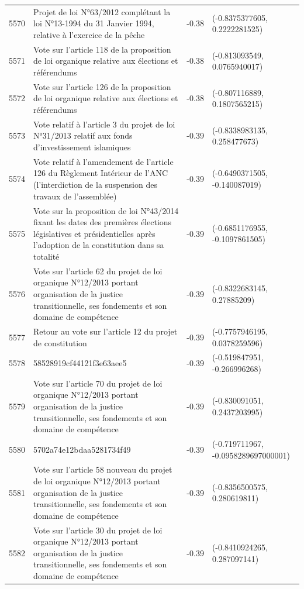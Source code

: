 \begin{table}[ht]
\begin{tabular}{rlrl}
  5570 & Projet de loi N°63/2012 complétant la loi N°13-1994 du 31 Janvier 1994, relative à l'exercice de la pêche & -0.38 & (-0.8375377605, 0.2222281525) \\ 
  5571 & Vote sur l'article 118 de la proposition de loi organique relative aux élections et référendums & -0.38 & (-0.813093549, 0.0765940017) \\ 
  5572 & Vote sur l'article 126 de la proposition de loi organique relative aux élections et référendums & -0.38 & (-0.807116889, 0.1807565215) \\ 
  5573 & Vote relatif à l'article 3 du projet de loi N°31/2013 relatif aux fonds d'investissement islamiques & -0.39 & (-0.8338983135, 0.258477673) \\ 
  5574 & Vote relatif à l'amendement de l'article 126 du Règlement Intérieur de l'ANC (l'interdiction de la suspension des travaux de l'assemblée) & -0.39 & (-0.6490371505, -0.140087019) \\ 
  5575 & Vote sur la proposition de loi N°43/2014 fixant les dates des premières élections législatives et présidentielles après l'adoption de la constitution dans sa totalité & -0.39 & (-0.6851176955, -0.1097861505) \\ 
  5576 & Vote sur l'article 62 du projet de loi organique N°12/2013 portant organisation de la justice transitionnelle, ses fondements et son domaine de compétence & -0.39 & (-0.8322683145, 0.27885209) \\ 
  5577 & Retour au vote sur l'article 12 du projet de constitution & -0.39 & (-0.7757946195, 0.0378259596) \\ 
  5578 & 58528919cf44121f3e63aee5 & -0.39 & (-0.519847951, -0.266996268) \\ 
  5579 & Vote sur l'article 70 du projet de loi organique N°12/2013 portant organisation de la justice transitionnelle, ses fondements et son domaine de compétence & -0.39 & (-0.830091051, 0.2437203995) \\ 
  5580 & 5702a74e12bdaa5281734f49 & -0.39 & (-0.719711967, -0.0958289697000001) \\ 
  5581 & Vote sur l'article 58 nouveau du projet de loi organique N°12/2013 portant organisation de la justice transitionnelle, ses fondements et son domaine de compétence & -0.39 & (-0.8356500575, 0.280619811) \\ 
  5582 & Vote sur l'article 30 du projet de loi organique N°12/2013 portant organisation de la justice transitionnelle, ses fondements et son domaine de compétence & -0.39 & (-0.8410924265, 0.287097141) \\ 

\end{tabular}
\end{table}
